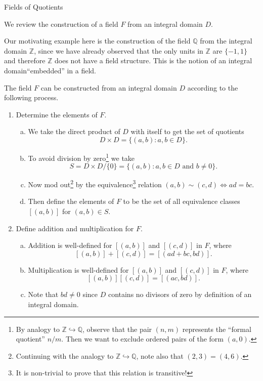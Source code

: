 \begin{section}{Fields of Quotients}

We review the construction of a field $F$ from an integral domain $D$.

\begin{rmk}
Our motivating example here is the construction of the field $\mathbb{Q}$ from the integral domain $\mathbb{Z}$, since we have already observed that the only units in $\mathbb{Z}$ are $\{-1,1\}$ and therefore $\mathbb{Z}$ does not have a field structure. This is the notion of an integral domain``embedded'' in a field. 
\end{rmk}

\begin{prop}
The field $F$ can be constructed from an integral domain $D$ according to the following process.
\begin{enumerate}[(1)]
\item Determine the elements of $F$.
\begin{enumerate}[(a)] %
\item We take the direct product of $D$ with itself to get the set of quotients
$$D \times D = \{(a,b) \colon a,b \in D\}.$$
\item To avoid division by zero\footnote{By analogy to $\mathbb{Z} \hookrightarrow \mathbb{Q}$, observe that the pair $(n,m)$ represents the ``formal quotient'' $n/m$. Then we want to exclude ordered pairs of the form $(a,0)$.} we take $$S = D \times D/\{0\} = \{(a,b) \colon a,b \in D \textrm{ and } b \neq 0\}.$$
\item Now mod out\footnote{Continuing with the analogy to $\mathbb{Z} \hookrightarrow \mathbb{Q}$, note also that $(2,3) = (4,6)$.} by the equivalence\footnote{It is non-trivial to prove that this relation is transitive!} relation $(a,b) \sim (c,d) \iff ad = bc.$
\item Then define the elements of $F$ to be the set of all equivalence classes $[(a,b)]$ for $(a,b) \in S$.
\end{enumerate} %
\item Define addition and multiplication for $F$.
\begin{enumerate}[(a)] %
\item Addition is well-defined for $[(a,b)]$ and $[(c,d)]$ in $F$, where
$$[(a,b)] + [(c,d)] = [(ad + bc, bd)].$$
\item Multiplication is well-defined for $[(a,b)]$ and $[(c,d)]$ in $F$, where
$$[(a,b)][(c,d)] = [(ac, bd)].$$
\item Note that $bd \neq 0$ since $D$ contains no divisors of zero by definition of an integral domain.

\end{enumerate}
\end{enumerate}
\end{prop}
\end{section}
